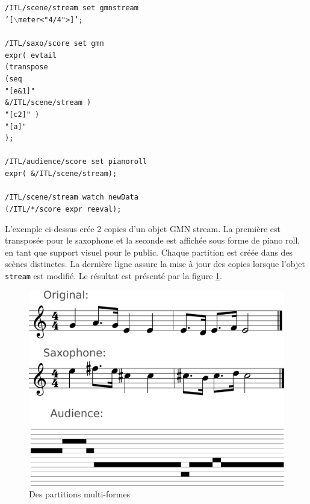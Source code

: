 \documentclass{article}
\newcommand{\OSC}[1]	{{\fontsize{10pt}{10pt} \selectfont\texttt{#1}}}
\newcommand{\tab}{\hspace*{4mm}}
\newcommand{\sample}	[1]			{\vspace{-0.2em}\begin{center}\colorbox{mygrey}{\begin{minipage}[t]{0.97\columnwidth} {\small \texttt{#1}}\end{minipage}}\end{center}}
\begin{document}
\sample{/ITL/scene/stream set gmnstream \\
\tab '[$\backslash$meter<"4/4">]';\\
\\
/ITL/saxo/score set gmn \\
\tab expr( evtail\\
\tab \tab (transpose\\
\tab \tab \tab (seq\\
\tab \tab \tab \tab "[e\&1]"\\
\tab \tab \tab \tab \&/ITL/scene/stream )\\
\tab \tab \tab "[c2]" )\\
\tab \tab "[a]"\\
\tab );\\
\\
/ITL/audience/score set pianoroll \\
\tab expr( \&/ITL/scene/stream);\\
\\
/ITL/scene/stream watch newData\\
\tab(/ITL/*/score expr reeval);
}
L'exemple ci-dessus crée 2 copies d'un objet GMN stream. La première est transposée pour le saxophone et la seconde est affichée sous forme de piano roll, en tant que support visuel pour le public. Chaque partition est créée dans des scènes distinctes. La dernière ligne assure la mise à jour des copies lorsque l'objet \OSC{stream} est modifié. Le résultat est présenté par la figure \ref{fig:mutliscoreFig}.

\begin{figure}[th]
\centering
\includegraphics[width=0.95\columnwidth]{imgs/example1}
\caption{Des partitions multi-formes
\label{fig:mutliscoreFig}}
\end{figure}
\end{document}
